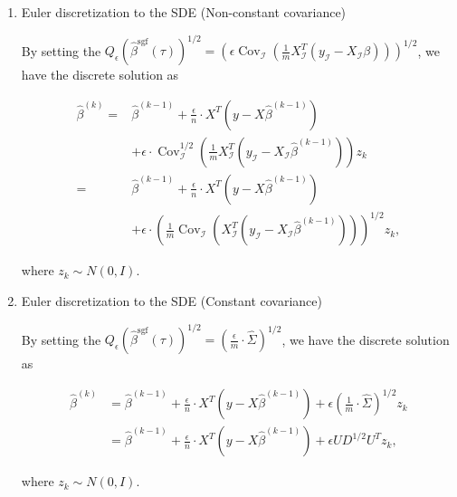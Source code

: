 \documentclass[11pt]{article}
\begin{document}
\begin{enumerate}
        \item Euler discretization to the SDE (Non-constant covariance)
        
        By setting the $Q_{\epsilon}\left(\hat{\beta}^{\operatorname{sgf}}(\tau)\right)^{1 / 2} = \left(\epsilon \operatorname{Cov}_{\mathcal{I}}\left(\frac{1}{m} X_{\mathcal{I}}^{T}\left(y_{\mathcal{I}}-X_{\mathcal{I}} \beta\right)\right)\right)^{1 / 2}$, we have the discrete solution as

        
        \begin{equation}
        \label{eq:11}
            \begin{aligned}
            \hat{\beta}^{(k)}=& \hat{\beta}^{(k-1)}+\frac{\epsilon}{n} \cdot X^{T}\left(y-X \hat{\beta}^{(k-1)}\right) \\
            &+\epsilon \cdot \operatorname{Cov}_{\mathcal{I}}^{1 / 2}\left(\frac{1}{m} X_{\mathcal{I}}^{T}\left(y_{\mathcal{I}}-X_{\mathcal{I}} \hat{\beta}^{(k-1)}\right)\right) z_{k} \\
            =& \hat{\beta}^{(k-1)}+\frac{\epsilon}{n} \cdot X^{T}\left(y-X \hat{\beta}^{(k-1)}\right) \\
            &+\epsilon \cdot \left(\frac{1}{m}\operatorname{Cov}_{\mathcal{I}} \left( X_{\mathcal{I}}^{T}\left(y_{\mathcal{I}}-X_{\mathcal{I}} \hat{\beta}^{(k-1)}\right)\right)\right)^{1 / 2} z_{k} ,
            \end{aligned}
        \end{equation}
        
        where $z_k \sim N(0,I)$.
        
        \item Euler discretization to the SDE (Constant covariance)
        
        By setting the $Q_{\epsilon}\left(\hat{\beta}^{\operatorname{sgf}}(\tau)\right)^{1 / 2} = \left(\frac{\epsilon}{m} \cdot \hat{\Sigma}\right)^{1 / 2}$, we have the discrete solution as

        
        \begin{equation}
        \label{eq:12}
            \begin{aligned}
            \hat{\beta}^{(k)} &= \hat{\beta}^{(k-1)}+\frac{\epsilon}{n} \cdot X^{T}\left(y-X \hat{\beta}^{(k-1)}\right) 
            +\epsilon \left(\frac{1}{m} \cdot \hat{\Sigma}\right)^{1 / 2} z_{k} \\
            &= \hat{\beta}^{(k-1)}+\frac{\epsilon}{n} \cdot X^{T}\left(y-X \hat{\beta}^{(k-1)}\right) 
            +\epsilon U D^{1/2} U^T z_{k}
            ,
            \end{aligned}
        \end{equation}
        
        where $z_k \sim N(0,I)$.
    \end{enumerate}
\end{document}
